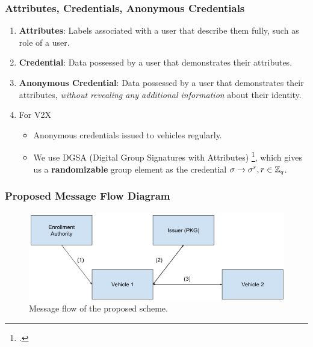 \documentclass{beamer}
\begin{document}
    \begin{frame}
        \frametitle{Attributes, Credentials, Anonymous Credentials}
        \begin{enumerate}
            \item<1-> \textbf{Attributes}: Labels associated with a user that
            describe them fully, such as role of a user.
            \item<2-> \textbf{Credential}: Data possessed by a user that
            demonstrates their attributes.
            \item<3-> \textbf{Anonymous Credential}: Data possessed by a user
            that demonstrates their attributes, \emph{without revealing any
            additional information} about their identity.
            \item<4-> For V2X
            \begin{itemize}
                \item Anonymous credentials issued to vehicles regularly.
                \item We use DGSA (Digital Group Signatures with Attributes)
                \footcite{camenischZoneEncryptionAnonymous2020}, which gives us
                a \textbf{randomizable} group element as the credential \(\sigma
                \rightarrow \sigma^r, r \in \mathbb Z_q\).
            \end{itemize}
        \end{enumerate}
    \end{frame}

    \begin{frame}
        \frametitle{Proposed Message Flow Diagram}
        \begin{figure}
            \centering
            \includegraphics[width=\columnwidth]{figs/flow.png}
            \caption{Message flow of the proposed scheme.}
            \label{fig:new-flow}
        \end{figure}
    \end{frame}
\end{document}
